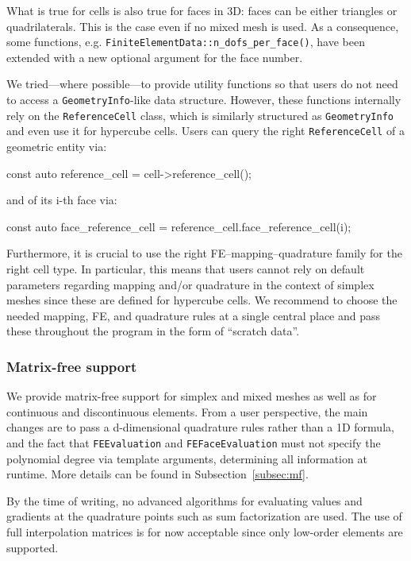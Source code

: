 \documentclass{ansarticle-preprint}
\begin{document}
What is true for cells is also true for faces in 3D: faces can be either triangles
or quadrilaterals. This is the case even if no mixed mesh is used. As a consequence, some functions, e.g. \texttt{FiniteElementData::n\_dofs\_per\_face()}, have been extended with a new optional argument for the face number.

We tried---where possible---to provide utility functions so that users do not need to access a \texttt{GeometryInfo}-like data structure. However, these functions internally rely on the \texttt{ReferenceCell} class, which is similarly structured as \texttt{GeometryInfo} and even use it for hypercube cells. Users can query the right \texttt{ReferenceCell} of a geometric entity via:
\begin{c++}
const auto reference_cell = cell->reference_cell();
\end{c++}
and of its i-th face via:
\begin{c++}
const auto face_reference_cell = reference_cell.face_reference_cell(i);
\end{c++}


Furthermore, it is crucial to use the right FE--mapping--quadrature family
for the right cell type. In particular, this means that users cannot
rely on default parameters regarding mapping and/or quadrature in the
context of simplex meshes since these are defined for hypercube cells.
We recommend to choose the needed mapping,
FE, and quadrature rules at a single central place and pass these throughout the program
in the form of ``scratch data''.

\subsubsection{Matrix-free support}

We provide matrix-free support for simplex and mixed meshes as well as for
continuous and discontinuous elements. From a user perspective, the main
changes are to pass a d-dimensional quadrature rules rather than a 1D formula,
and the fact that \texttt{FEEvaluation} and \texttt{FEFaceEvaluation} must not
specify the polynomial degree via template arguments, determining all
information at runtime. More details can be found in
Subsection~\ref{subsec:mf}.

By the time of writing, no advanced algorithms for evaluating values and
gradients at the quadrature points such as sum factorization are used.
The use of full interpolation matrices is for now acceptable since only low-order elements are
supported.
\end{document}
